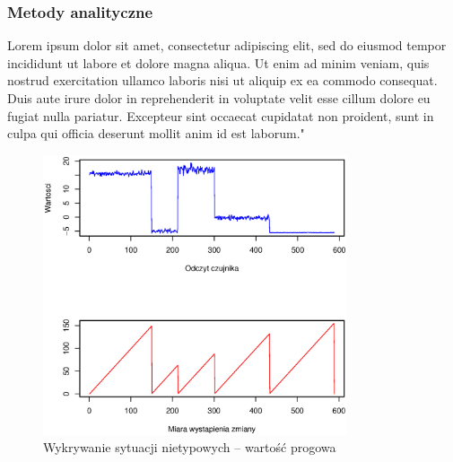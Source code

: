 \newpage
\subsubsection{Metody analityczne}
Lorem ipsum dolor sit amet, consectetur adipiscing elit, sed do eiusmod tempor incididunt ut labore et dolore magna aliqua. Ut enim ad minim veniam, quis nostrud exercitation ullamco laboris nisi ut aliquip ex ea commodo consequat. Duis aute irure dolor in reprehenderit in voluptate velit esse cillum dolore eu fugiat nulla pariatur. Excepteur sint occaecat cupidatat non proident, sunt in culpa qui officia deserunt mollit anim id est laborum."
\begin{figure}[htbp]
\centering
	\includegraphics[width=0.8\textwidth]{img/ch-2-change}
	\caption{Wykrywanie sytuacji nietypowych -- wartość progowa}
  \label{fig:SignalAnalytics}
\end{figure}
